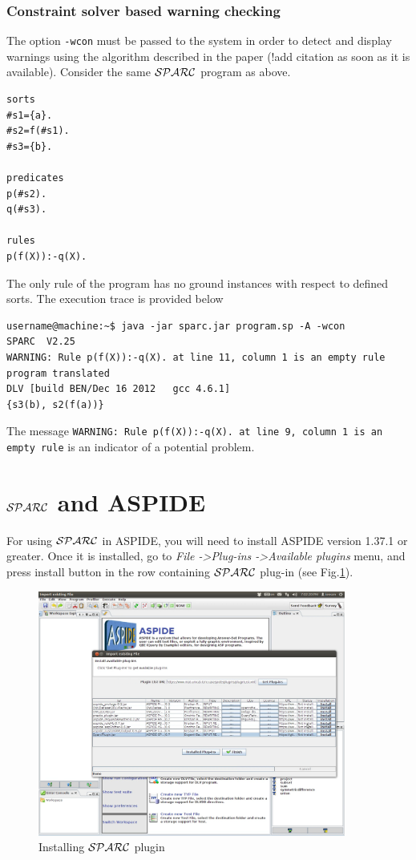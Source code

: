 \documentclass[12pt, letterpaper]{article}
\begin{document}
\subsubsection{Constraint solver based warning checking}\label{clp_type_warnings}

The option \texttt{-wcon} must be passed to the  system  in order to detect and display warnings using the algorithm described in the paper \cite{?} (!add citation as soon as it is available).
Consider the same ${\cal SPARC}$ program as above.

\begin{verbatim}
sorts
#s1={a}.
#s2=f(#s1).
#s3={b}.

predicates
p(#s2).
q(#s3).

rules
p(f(X)):-q(X).
\end{verbatim}

The only rule of the program has no ground instances with respect to defined sorts.
The execution trace is provided below
\begin{verbatim}
username@machine:~$ java -jar sparc.jar program.sp -A -wcon
SPARC  V2.25
WARNING: Rule p(f(X)):-q(X). at line 11, column 1 is an empty rule
program translated
DLV [build BEN/Dec 16 2012   gcc 4.6.1]
{s3(b), s2(f(a))}
\end{verbatim}

The message \texttt{WARNING: Rule p(f(X)):-q(X). at line 9, column 1 is an empty rule} is an indicator of a potential problem.

\section{${\cal SPARC}$ and ASPIDE}
For using ${\cal SPARC}$ in ASPIDE, you will need to install ASPIDE version 1.37.1 or greater. Once it is installed, go to \textit{File -\textgreater Plug-ins -\textgreater Available plugins} menu, 
and press install button in the row containing ${\cal SPARC}$ plug-in (see Fig.\ref{fig:plug_install}).
\begin{figure}[p]
\centering
\includegraphics[width=0.9\textwidth]{plugin.png}
\caption{Installing ${\cal SPARC}$ plugin}
\label{fig:plug_install}
\end{figure}
\end{document}
